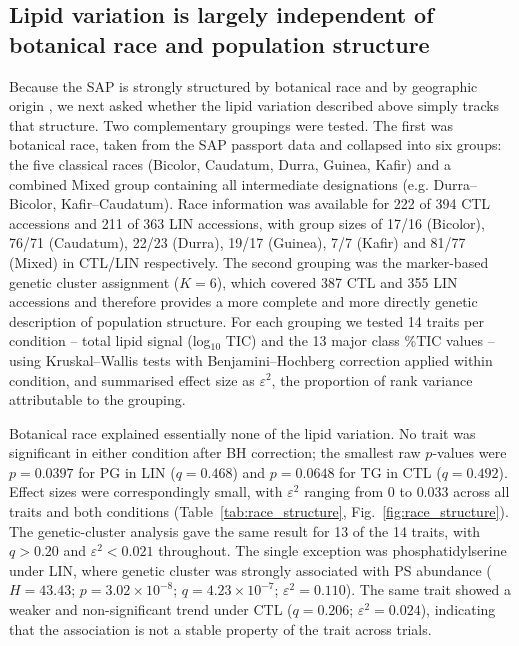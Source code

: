 


\subsection{Lipid variation is largely independent of botanical race and population structure}

Because the SAP is strongly structured by botanical race and by geographic origin \citep{Casa2008, Boatwright2022}, we next asked whether the lipid variation described above simply tracks that structure. Two complementary groupings were tested. The first was botanical race, taken from the SAP passport data and collapsed into six groups: the five classical races (Bicolor, Caudatum, Durra, Guinea, Kafir) and a combined Mixed group containing all intermediate designations (e.g. Durra--Bicolor, Kafir--Caudatum). Race information was available for 222 of 394 CTL accessions and 211 of 363 LIN accessions, with group sizes of 17/16 (Bicolor), 76/71 (Caudatum), 22/23 (Durra), 19/17 (Guinea), 7/7 (Kafir) and 81/77 (Mixed) in CTL/LIN respectively. The second grouping was the marker-based genetic cluster assignment ($K=6$), which covered 387 CTL and 355 LIN accessions and therefore provides a more complete and more directly genetic description of population structure. For each grouping we tested 14 traits per condition -- total lipid signal (log$_{10}$ TIC) and the 13 major class \%TIC values -- using Kruskal--Wallis tests with Benjamini--Hochberg correction applied within condition, and summarised effect size as $\varepsilon^2$, the proportion of rank variance attributable to the grouping.

Botanical race explained essentially none of the lipid variation. No trait was significant in either condition after BH correction; the smallest raw $p$-values were $p=0.0397$ for PG in LIN ($q=0.468$) and $p=0.0648$ for TG in CTL ($q=0.492$). Effect sizes were correspondingly small, with $\varepsilon^2$ ranging from $0$ to $0.033$ across all traits and both conditions (Table~\ref{tab:race_structure}, Fig.~\ref{fig:race_structure}). The genetic-cluster analysis gave the same result for 13 of the 14 traits, with $q>0.20$ and $\varepsilon^2<0.021$ throughout. The single exception was phosphatidylserine under LIN, where genetic cluster was strongly associated with PS abundance ($H=43.43$; $p=3.02\times10^{-8}$; $q=4.23\times10^{-7}$; $\varepsilon^2=0.110$). The same trait showed a weaker and non-significant trend under CTL ($q=0.206$; $\varepsilon^2=0.024$), indicating that the association is not a stable property of the trait across trials.

